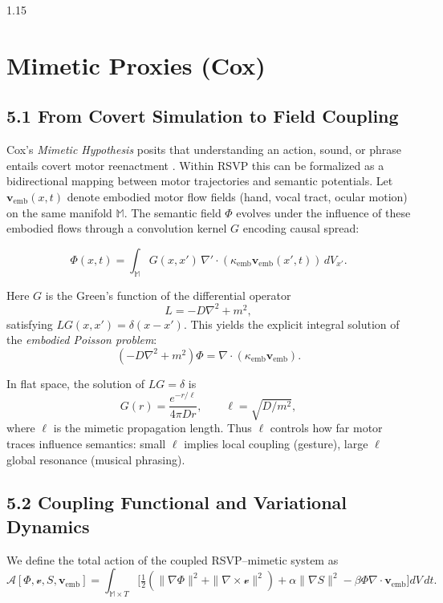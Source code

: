 \documentclass[12pt,a4paper]{article}
\begin{document}
\begin{spacing}{1.15}
\section{Mimetic Proxies (Cox)}

\subsection{5.1 From Covert Simulation to Field Coupling}

Cox’s \emph{Mimetic Hypothesis} posits that understanding an action, sound, or phrase entails covert motor reenactment \cite{cox2016}.  
Within RSVP this can be formalized as a bidirectional mapping between motor trajectories and semantic potentials.  
Let $\boldsymbol{v}_{\mathrm{emb}}(x,t)$ denote embodied motor flow fields (hand, vocal tract, ocular motion) on the same manifold $\mathbb{M}$.  
The semantic field $\Phi$ evolves under the influence of these embodied flows through a convolution kernel $G$ encoding causal spread:

\begin{equation}
\Phi(x,t)
 = \int_{\mathbb{M}} G(x,x')\,\nabla'\!\cdot(\kappa_{\mathrm{emb}}\boldsymbol{v}_{\mathrm{emb}}(x',t))\,dV_{x'}.
\label{eq:PhiG}
\end{equation}

Here $G$ is the Green’s function of the differential operator
\[
L = -D\nabla^2 + m^2,
\]
satisfying $L G(x,x') = \delta(x-x')$.  
This yields the explicit integral solution of the \emph{embodied Poisson problem}:
\[
(-D\nabla^2 + m^2)\Phi = \nabla\!\cdot(\kappa_{\mathrm{emb}}\boldsymbol{v}_{\mathrm{emb}}).
\]

\begin{proposition}
In flat space, the solution of $LG=\delta$ is
\[
G(r)=\frac{e^{-r/\ell}}{4\pi D r},\qquad \ell=\sqrt{D/m^2},
\]
where $\ell$ is the mimetic propagation length.  Thus $\ell$ controls how far motor traces influence semantics: small $\ell$ implies local coupling (gesture), large $\ell$ global resonance (musical phrasing).
\end{proposition}

\subsection{5.2 Coupling Functional and Variational Dynamics}

We define the total action of the coupled RSVP–mimetic system as
\begin{equation}
\mathcal{A}[\Phi,\boldsymbol{\mathcal v},S,\boldsymbol{v}_{\mathrm{emb}}]
 = \int_{\mathbb{M}\times T}
   \Big[
     \tfrac{1}{2}(\|\nabla\Phi\|^2
       +\|\nabla\times\boldsymbol{\mathcal v}\|^2)
     +\alpha\|\nabla S\|^2
     -\beta\Phi\nabla\!\cdot\boldsymbol{v}_{\mathrm{emb}}
   \Big] dV\,dt.
\label{eq:action}
\end{equation}


\end{spacing}
\end{document}

